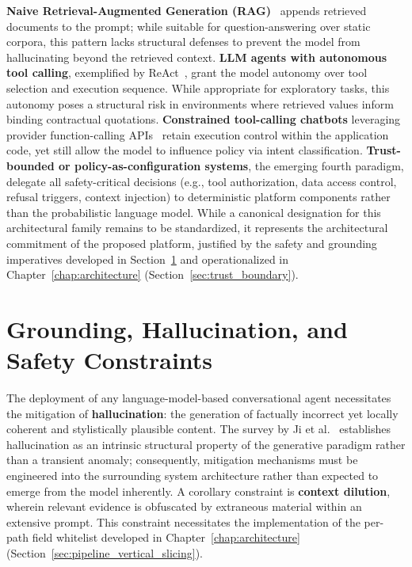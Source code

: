 \textbf{Naive Retrieval-Augmented Generation (RAG)}~\cite{lewis2020rag} appends retrieved documents to the prompt; while suitable for question-answering over static corpora, this pattern lacks structural defenses to prevent the model from hallucinating beyond the retrieved context. \textbf{LLM agents with autonomous tool calling}, exemplified by ReAct~\cite{yao2023react}, grant the model autonomy over tool selection and execution sequence. While appropriate for exploratory tasks, this autonomy poses a structural risk in environments where retrieved values inform binding contractual quotations. \textbf{Constrained tool-calling chatbots} leveraging provider function-calling APIs~\cite{anthropic_tool_use_docs} retain execution control within the application code, yet still allow the model to influence policy via intent classification. \textbf{Trust-bounded or policy-as-configuration systems}, the emerging fourth paradigm, delegate all safety-critical decisions (e.g., tool authorization, data access control, refusal triggers, context injection) to deterministic platform components rather than the probabilistic language model. While a canonical designation for this architectural family remains to be standardized, it represents the architectural commitment of the proposed platform, justified by the safety and grounding imperatives developed in Section~\ref{sec:hallucination} and operationalized in Chapter~\ref{chap:architecture} (Section~\ref{sec:trust_boundary}).

\section{Grounding, Hallucination, and Safety Constraints}\label{sec:hallucination}
The deployment of any language-model-based conversational agent necessitates the mitigation of \textbf{hallucination}: the generation of factually incorrect yet locally coherent and stylistically plausible content. The survey by Ji et al.~\cite{ji2023hallucination} establishes hallucination as an intrinsic structural property of the generative paradigm rather than a transient anomaly; consequently, mitigation mechanisms must be engineered into the surrounding system architecture rather than expected to emerge from the model inherently. A corollary constraint is \textbf{context dilution}, wherein relevant evidence is obfuscated by extraneous material within an extensive prompt. This constraint necessitates the implementation of the per-path field whitelist developed in Chapter~\ref{chap:architecture} (Section~\ref{sec:pipeline_vertical_slicing}).

